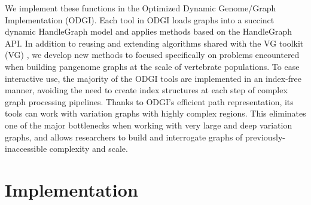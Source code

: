 \documentclass{bioinfo}
\begin{document}

We implement these functions in the Optimized Dynamic Genome/Graph Implementation (ODGI).
Each tool in ODGI loads graphs into a succinct dynamic HandleGraph model \citep{Eizenga_2020_BX} and applies methods based on the HandleGraph API.
In addition to reusing and extending algorithms shared with the VG toolkit (VG) \citep{Garrison:2018}, we develop new methods to focused specifically on problems encountered when building pangenome graphs at the scale of vertebrate populations.
To ease interactive use, the majority of the ODGI tools are implemented in an index-free manner, avoiding the need to create index structures at each step of complex graph processing pipelines.
Thanks to ODGI's efficient path representation, its tools can work with variation graphs with highly complex regions.
This eliminates one of the major bottlenecks when working with very large and deep variation graphs, and allows researchers to build and interrogate graphs of previously-inaccessible complexity and scale.


\section{Implementation}
\end{document}
